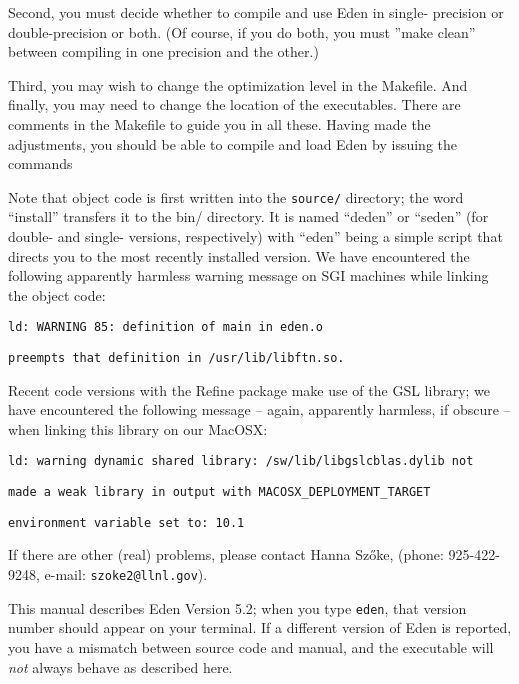 \documentclass{report}
\begin{document}
{

\vspace{0.1in}

Second, you must decide whether to compile and use Eden in single-
precision or double-precision or both.  (Of course, if you do both, you must ''make clean''
between compiling in one precision and the other.)

\vspace{0.1in}

Third, you may wish to change the optimization level in the Makefile. 
And finally,
you may need to change the location of the executables.
There are comments in the Makefile to guide you in all these.
Having made the adjustments, you should be able to compile and load Eden
by issuing the commands 



Note that object code is first written into the {\tt source/} directory; 
the word ``install'' transfers it to the bin/ directory.  It is named ``deden'' 
or ``seden'' (for double- and single- versions, respectively) 
with ``eden'' being a simple
script that directs you to the most recently installed version.
We have encountered the following apparently harmless warning message on SGI 
machines while linking the object code: 

{\tt ld: WARNING 85: definition of main in eden.o }

{\tt  preempts that definition in /usr/lib/libftn.so.}  

Recent code versions with the Refine package make use of the GSL library;
we have encountered the following message -- again, apparently harmless,
if obscure -- when linking this library on our MacOSX:

{\tt ld: warning dynamic shared library: /sw/lib/libgslcblas.dylib not}

{\tt made a weak library in output with MACOSX\_DEPLOYMENT\_TARGET}

{\tt environment variable set to: 10.1}

If there are other (real) problems, please contact
Hanna Sz\H{o}ke, (phone: 925-422-9248, e-mail: \verb+szoke2@llnl.gov+).

\vspace {0.1in}

This manual describes Eden Version 5.2; when you type {\tt eden}, that
version number should appear on your terminal.  
If a different version of Eden is reported, you have a mismatch between
source code and manual, and the executable will {\em not} always behave
as described here.  

}
\end{document}
